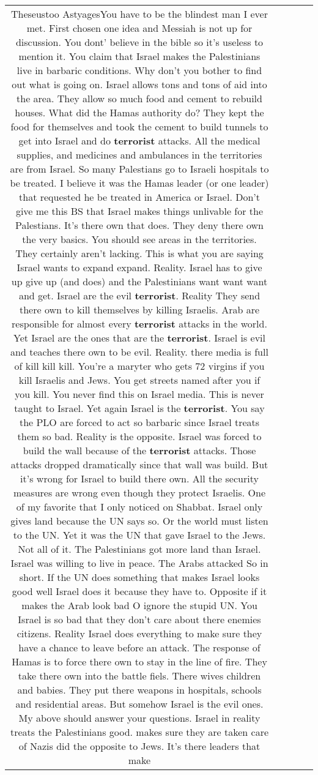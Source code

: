 \documentclass[11pt]{article}
\newlength\mylength
\begin{document}
\begin{center}
\begin{longtable}{|C{.65\mylength}|C{.30\mylength}|C{.12\mylength}|C{.12\mylength}|C{.12\mylength}|}
  \small Theseustoo AstyagesYou have to be the blindest man I ever met. First chosen one idea and Messiah is not up for discussion. You dont' believe in the bible so it's useless to mention it. You claim that Israel makes the Palestinians live in barbaric conditions. Why don't you bother to find out what is going on. Israel allows tons and tons of aid into the area. They allow so much food and cement to rebuild houses. What did the Hamas authority do? They kept the food for themselves and took the cement to build tunnels to get into Israel and do \textbf{terrorist} attacks. All the medical supplies, and medicines and ambulances in the territories are from Israel. So many Palestians go to Israeli hospitals to be treated. I believe it was the Hamas leader (or one leader) that requested he be treated in America or Israel. Don't give me this BS that Israel makes things unlivable for the Palestians. It's there own that does. They deny there own the very basics.  You should see areas in the territories. They certainly aren't lacking. This is what you are saying Israel wants to expand expand. Reality. Israel has to give up give up (and does) and the Palestinians want want want and get. Israel are the evil \textbf{terrorist}. Reality They send there own to kill themselves by killing Israelis. Arab are responsible for almost every \textbf{terrorist} attacks in the world. Yet Israel are the ones that are the \textbf{terrorist}. Israel is evil and teaches there own to be evil.  Reality. there media is full of kill kill kill. You're a maryter who gets 72 virgins if you kill Israelis and Jews. You get streets named after you if you kill. You never find this on Israel media. This is never taught to Israel. Yet again Israel is the \textbf{terrorist}. You say the PLO are forced to act so barbaric since Israel treats them so bad. Reality is the opposite. Israel was forced to build the wall because of the \textbf{terrorist} attacks. Those attacks dropped dramatically since that wall was build. But it's wrong for Israel to build there own. All the security measures are wrong even though they protect Israelis. One of my favorite that I only noticed on Shabbat. Israel only gives land because the UN says so. Or the world must listen to the UN. Yet it was the UN that gave Israel to the Jews. Not all of it. The Palestinians got more land than Israel. Israel was willing to live in  peace. The Arabs attacked  So in short. If the UN does something that makes Israel looks good well Israel does it because they have to. Opposite if it makes the Arab look bad O ignore the stupid UN. You Israel is so bad that they don't care about there enemies citizens. Reality Israel does everything to make sure they have a chance to leave before an attack. The response of Hamas is to force there own to stay in the line of fire. They take there own into the battle fiels. There wives children and babies. They put there weapons in hospitals, schools and residential areas. But somehow  Israel is the evil ones. My above should answer your questions.  Israel in reality treats the Palestinians good. makes sure they are taken care of Nazis did the opposite to Jews. It's there leaders that make 
\end{longtable}
\end{center}
\end{document}

